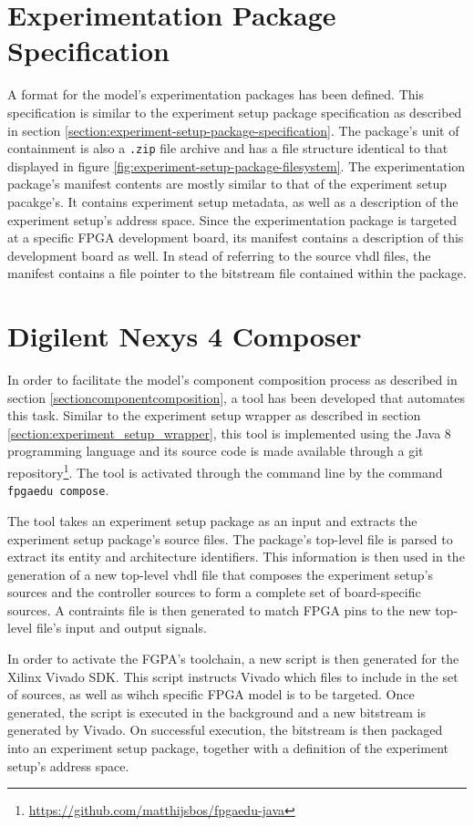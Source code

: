 \documentclass[main.tex]{subfiles}
\begin{document}
\section{Experimentation Package Specification}
A format for the model's experimentation packages has been defined. This specification is similar to the experiment setup package specification as described in section \ref{section:experiment-setup-package-specification}. The package's unit of containment is also a \texttt{.zip} file archive and has a file structure identical to that displayed in figure \ref{fig:experiment-setup-package-filesystem}. The experimentation package's manifest contents are mostly similar to that of the experiment setup pacakge's. It contains experiment setup metadata, as well as a description of the experiment setup's address space. Since the experimentation package is targeted at a specific FPGA development board, its manifest contains a description of this development board as well. In stead of referring to the source vhdl files, the manifest contains a file pointer to the bitstream file contained within the package. 

\section{Digilent Nexys 4 Composer}
In order to facilitate the model's component composition process as described in section \ref{sectioncomponentcomposition}, a tool has been developed that automates this task. Similar to the experiment setup wrapper as described in section \ref{section:experiment_setup_wrapper}, this tool is implemented using the Java 8 programming language and its source code is made available through a git repository\footnote{\url{https://github.com/matthijsbos/fpgaedu-java}}. The tool is activated through the command line by the command \texttt{fpgaedu compose}.

The tool takes an experiment setup package as an input and extracts the experiment setup package's source files. The package's top-level file is parsed to extract its entity and architecture identifiers. This information is then used in the generation of a new top-level vhdl file that composes the experiment setup's sources and the controller sources to form a complete set of board-specific sources. A contraints file is then generated to match FPGA pins to the new top-level file's input and output signals.

In order to activate the FGPA's toolchain, a new script is then generated for the Xilinx Vivado SDK. This script instructs Vivado which files to include in the set of sources, as well as wihch specific FPGA model is to be targeted. Once generated, the script is executed in the background and a new bitstream is generated by Vivado. On successful execution, the bitstream is then packaged into an experiment setup package, together with a definition of the experiment setup's address space.

\end{document}
